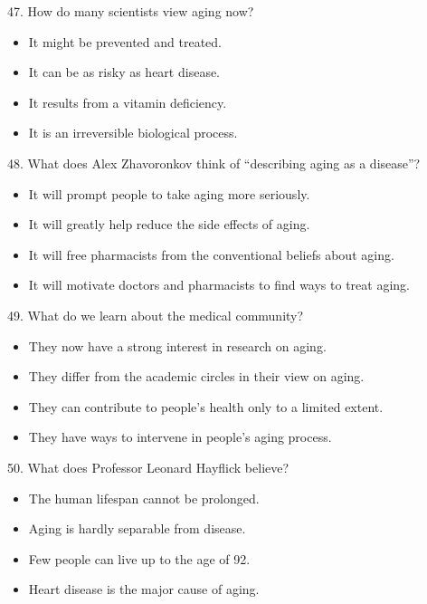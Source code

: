 \documentclass[UTF8,11pt]{ctexart}
\begin{document}
47. How do many scientists view aging now?


\begin{itemize}[leftmargin=2em,itemsep=.2em,topsep=.4em]\item[A.] It might be prevented and treated.
\item[B.] It can be as risky as heart disease.
\item[C.] It results from a vitamin deficiency.
\item[D.] It is an irreversible biological process.
\end{itemize}

48. What does Alex Zhavoronkov think of “describing aging as a disease”?


\begin{itemize}[leftmargin=2em,itemsep=.2em,topsep=.4em]\item[A.] It will prompt people to take aging more seriously.
\item[B.] It will greatly help reduce the side effects of aging.
\item[C.] It will free pharmacists from the conventional beliefs about aging.
\item[D.] It will motivate doctors and pharmacists to find ways to treat aging.
\end{itemize}

49. What do we learn about the medical community?


\begin{itemize}[leftmargin=2em,itemsep=.2em,topsep=.4em]\item[A.] They now have a strong interest in research on aging.
\item[B.] They differ from the academic circles in their view on aging.
\item[C.] They can contribute to people’s health only to a limited extent.
\item[D.] They have ways to intervene in people’s aging process.
\end{itemize}

50. What does Professor Leonard Hayflick believe?


\begin{itemize}[leftmargin=2em,itemsep=.2em,topsep=.4em]\item[A.] The human lifespan cannot be prolonged.
\item[B.] Aging is hardly separable from disease.
\item[C.] Few people can live up to the age of 92.
\item[D.] Heart disease is the major cause of aging.
\end{itemize}
\end{document}
